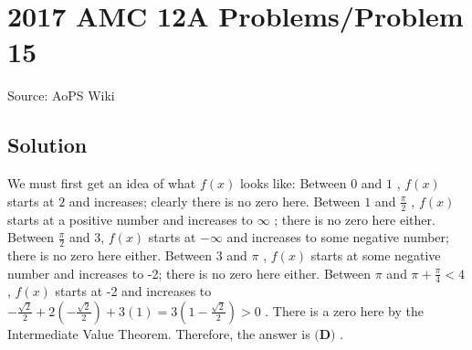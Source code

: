 \documentclass[12pt]{article}
\begin{document}
\section*{{2017 AMC 12A Problems/Problem 15}}
Source: AoPS Wiki

\subsection*{Solution}
We must first get an idea of what $f(x)$ looks like: Between $0$ and $1$ , $f(x)$ starts at $2$ and increases; clearly there is no zero here. Between $1$ and $\frac{\pi}{2}$ , $f(x)$ starts at a positive number and increases to $\infty$ ; there is no zero here either. Between $\frac{\pi}{2}$ and 3, $f(x)$ starts at $-\infty$ and increases to some negative number; there is no zero here either. Between $3$ and $\pi$ , $f(x)$ starts at some negative number and increases to -2; there is no zero here either. Between $\pi$ and $\pi+\frac{\pi}{4} < 4$ , $f(x)$ starts at -2 and increases to $-\frac{\sqrt2}{2} + 2\left(-\frac{\sqrt2}{2}\right) + 3\left(1\right)=3\left(1-\frac{\sqrt2}{2}\right)>0$ . There is a zero here by the Intermediate Value Theorem. Therefore, the answer is $\boxed{\textbf{(D)}}$ .
\end{document}
